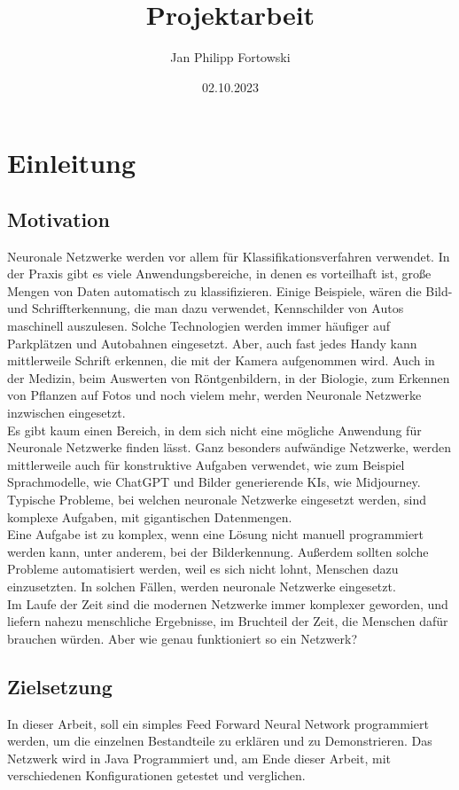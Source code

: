\documentclass[12pt]{article}
\title{\textbf{Projektarbeit}}
\author{Jan Philipp Fortowski}
\date{02.10.2023}
\begin{document}
\maketitle
\cleardoublepage
\tableofcontents
\cleardoublepage
\thispagestyle{empty}

\section{Einleitung}
\subsection{Motivation}
Neuronale Netzwerke werden vor allem für Klassifikationsverfahren verwendet. In der Praxis gibt es viele Anwendungsbereiche, in denen es vorteilhaft ist, große Mengen von Daten automatisch zu klassifizieren. Einige Beispiele, wären die Bild- und Schriffterkennung, die man dazu verwendet, Kennschilder von Autos maschinell auszulesen. Solche Technologien werden immer häufiger auf Parkplätzen und Autobahnen eingesetzt. Aber, auch fast jedes Handy kann mittlerweile Schrift erkennen, die mit der Kamera aufgenommen wird. Auch in der Medizin, beim Auswerten von Röntgenbildern, in der Biologie, zum Erkennen von Pflanzen auf Fotos und noch vielem mehr, werden Neuronale Netzwerke inzwischen eingesetzt.\\  
Es gibt kaum einen Bereich, in dem sich nicht eine mögliche Anwendung für Neuronale Netzwerke finden lässt. Ganz besonders aufwändige Netzwerke, werden mittlerweile auch für konstruktive Aufgaben verwendet, wie zum Beispiel Sprachmodelle, wie ChatGPT und Bilder generierende KIs, wie Midjourney.
Typische Probleme, bei welchen neuronale Netzwerke eingesetzt werden, sind komplexe Aufgaben, mit gigantischen Datenmengen.\\
Eine Aufgabe ist zu komplex, wenn eine Lösung nicht manuell programmiert werden kann, unter anderem, bei der Bilderkennung. Außerdem sollten solche Probleme automatisiert werden, weil es sich nicht lohnt, Menschen dazu einzusetzten. 
In solchen Fällen, werden neuronale Netzwerke eingesetzt.\\
Im Laufe der Zeit sind die modernen Netzwerke immer komplexer geworden, und liefern nahezu menschliche Ergebnisse, im Bruchteil der Zeit, die Menschen dafür brauchen würden. Aber wie genau funktioniert so ein Netzwerk?
\subsection{Zielsetzung}
In dieser Arbeit, soll ein simples Feed Forward Neural Network programmiert werden, um die einzelnen Bestandteile zu erklären und zu Demonstrieren. Das Netzwerk wird in Java Programmiert und, am Ende dieser Arbeit, mit verschiedenen Konfigurationen getestet und verglichen.
\end{document}

